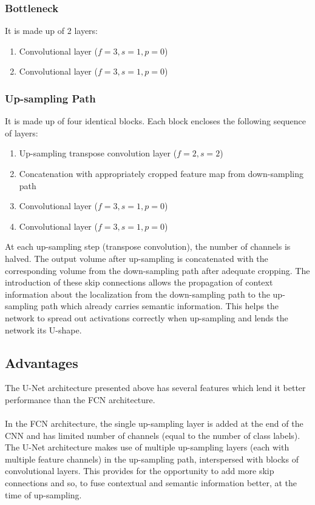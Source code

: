 \documentclass[12pt, a4paper]{report}
\begin{document}
\subsubsection{Bottleneck}
It is made up of 2 layers:
\begin{enumerate}
	\item Convolutional layer ($f=3, s=1, p=0$)
	\item Convolutional layer ($f=3, s=1, p=0$)
\end{enumerate}
\subsubsection{Up-sampling Path}
It is made up of four identical blocks. Each block encloses the following sequence of layers:
\begin{enumerate}
	\item Up-sampling transpose convolution layer ($f=2, s=2$)
	\item Concatenation with appropriately cropped feature map from down-sampling path
	\item Convolutional layer ($f=3, s=1, p=0$)
	\item Convolutional layer ($f=3, s=1, p=0$)
\end{enumerate}
At each up-sampling step (transpose convolution), the number of channels is halved. The output volume after up-sampling is concatenated with the corresponding volume from the down-sampling path after adequate cropping. The introduction of these skip connections allows the propagation of context information about the localization from the down-sampling path to the up-sampling path which already carries semantic information. This helps the network to spread out activations correctly when up-sampling and lends the network its U-shape.
\subsection{Advantages}
The U-Net architecture presented above has several features which lend it better performance than the FCN architecture.
\paragraph{}
In the FCN architecture, the single up-sampling layer is added at the end of the CNN and has limited number of channels (equal to the number of class labels). The U-Net architecture makes use of multiple up-sampling layers (each with multiple feature channels) in the up-sampling path, interspersed with blocks of convolutional layers. This provides for the opportunity to add more skip connections and so, to fuse contextual and semantic information better, at the time of up-sampling. 
\end{document}
